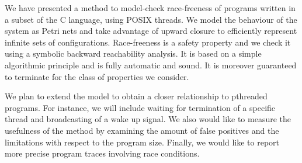 \label{section:conclusion}

We have presented a method to model-check race-freeness of programs
written in a subset of the C language, using POSIX threads. We model
the behaviour of the system as Petri nets and take advantage of upward
closure to efficiently represent infinite sets of
configurations. Race-freeness is a safety property and we check it
using a symbolic backward reachability analysis. It is based on a
simple algorithmic principle and is fully automatic and sound. It is
moreover guaranteed to terminate for the class of properties we
consider.
%

We plan to extend the model to obtain a closer relationship to
pthreaded programs. For instance, we will include waiting for
termination of a specific thread and broadcasting of a wake up
signal. We also would like to measure the usefulness of the method by
examining the amount of false positives and the limitations with
respect to the program size. Finally, we would like to report more
precise program traces involving race conditions.
%
